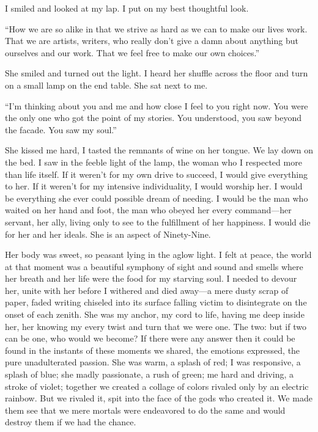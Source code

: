 I smiled and looked at my lap. I put on my best thoughtful look.

``How we are so alike in that we strive as hard as we can to make our
lives work. That we are artists, writers, who really don't give a damn
about anything but ourselves and our work. That we feel free to make our
own choices.''

She smiled and turned out the light. I heard her shuffle across the
floor and turn on a small lamp on the end table. She sat next to me.

``I'm thinking about you and me and how close I feel to you right now.
You were the only one who got the point of my stories. You understood,
you saw beyond the facade. You saw my soul.''

She kissed me hard, I tasted the remnants of wine on her tongue. We lay
down on the bed. I saw in the feeble light of the lamp, the woman who I
respected more than life itself. If it weren't for my own drive to
succeed, I would give everything to her. If it weren't for my intensive
individuality, I would worship her. I would be everything she ever could
possible dream of needing. I would be the man who waited on her hand and
foot, the man who obeyed her every command---her servant, her ally,
living only to see to the fulfillment of her happiness. I would die for
her and her ideals. She is an aspect of Ninety-Nine.

Her body was sweet, so peasant lying in the aglow light. I felt at
peace, the world at that moment was a beautiful symphony of sight and
sound and smells where her breath and her life were the food for my
starving soul. I needed to devour her, unite with her before I withered
and died away---a mere dusty scrap of paper, faded writing chiseled into
its surface falling victim to disintegrate on the onset of each zenith.
She was my anchor, my cord to life, having me deep inside her, her
knowing my every twist and turn that we were one. The two: but if two
can be one, who would we become? If there were any answer then it could
be found in the instants of these moments we shared, the emotions
expressed, the pure unadulterated passion. She was warm, a splash of
red; I was responsive, a splash of blue; she madly passionate, a rush of
green; me hard and driving, a stroke of violet; together we created a
collage of colors rivaled only by an electric rainbow. But we rivaled
it, spit into the face of the gods who created it. We made them see that
we mere mortals were endeavored to do the same and would destroy them if
we had the chance.

